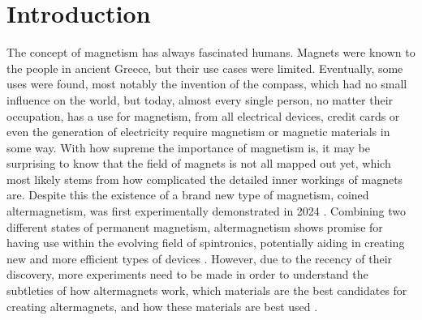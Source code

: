 \section{Introduction}
    The concept of magnetism has always fascinated humans. Magnets were known to the people in ancient Greece, but their use cases were limited. Eventually, some uses were found, most notably the invention of the compass, which had no small influence on the world, but today, almost every single person, no matter their occupation, has a use for magnetism, from all electrical devices, credit cards or even the generation of electricity require magnetism or magnetic materials in some way. With how supreme the importance of magnetism is, it may be surprising to know that the field of magnets is not all mapped out yet, which most likely stems from how complicated the detailed inner workings of magnets are. Despite this the existence of a brand new type of magnetism, coined altermagnetism, was first experimentally demonstrated in 2024 \cite{krempasky2024altermagnetic}. Combining two different states of permanent magnetism, altermagnetism shows promise for having use within the evolving field of spintronics, potentially aiding in creating new and more efficient types of devices \cite{fu2025all}. However, due to the recency of their discovery, more experiments need to be made in order to understand the subtleties of how altermagnets work, which materials are the best candidates for creating altermagnets, and how these materials are best used \cite{vsmejkal2022emerging}. 
